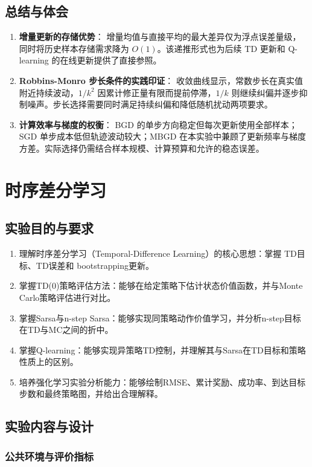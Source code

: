 \documentclass[11pt,a4paper,UTF8]{ctexart}
\numberwithin{figure}{section}
\numberwithin{table}{section}
\begin{document}
\subsection{总结与体会}

\begin{enumerate}
\item \textbf{增量更新的存储优势}：
   增量均值与直接平均的最大差异仅为浮点误差量级，同时将历史样本存储需求降为 $O(1)$。该递推形式也为后续 TD 更新和 Q-learning 的在线更新提供了直接参照。
\item \textbf{Robbins-Monro 步长条件的实践印证}：
   收敛曲线显示，常数步长在真实值附近持续波动，$1/k^2$ 因累计修正量有限而提前停滞，$1/k$ 则继续纠偏并逐步抑制噪声。步长选择需要同时满足持续纠偏和降低随机扰动两项要求。
\item \textbf{计算效率与梯度的权衡}：
   BGD 的单步方向稳定但每次更新使用全部样本；SGD 单步成本低但轨迹波动较大；MBGD 在本实验中兼顾了更新频率与梯度方差。实际选择仍需结合样本规模、计算预算和允许的稳态误差。
\end{enumerate}

\newpage
\section{时序差分学习}

\subsection{实验目的与要求}
\begin{enumerate}
\item 理解时序差分学习（Temporal-Difference Learning）的核心思想：掌握 TD目标、TD误差和 bootstrapping更新。
\item 掌握TD(0)策略评估方法：能够在给定策略下估计状态价值函数，并与Monte Carlo策略评估进行对比。
\item 掌握Sarsa与n-step Sarsa：能够实现同策略动作价值学习，并分析n-step目标在TD与MC之间的折中。
\item 掌握Q-learning：能够实现异策略TD控制，并理解其与Sarsa在TD目标和策略性质上的区别。
\item 培养强化学习实验分析能力：能够绘制RMSE、累计奖励、成功率、到达目标步数和最终策略图，并给出合理解释。
\end{enumerate}
\subsection{实验内容与设计}

\subsubsection{公共环境与评价指标}
\end{document}
